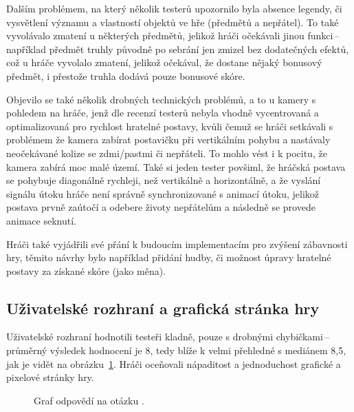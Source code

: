 Dalším problémem, na který několik testerů upozornilo byla absence legendy, či vysvětlení významu a vlastností objektů ve hře (předmětů a nepřátel). To také vyvolávalo zmatení u některých předmětů, jelikož hráči očekávali jinou funkci\,--\,například předmět truhly původně po sebrání jen zmizel bez dodatečných efektů, což u hráče vyvolalo zmatení, jelikož očekával, že dostane nějaký bonusový předmět, i přestože truhla dodává pouze bonusové skóre.

Objevilo se také několik drobných technických problémů, a to u kamery s pohledem na hráče, jenž dle recenzí testerů nebyla vhodně vycentrovaná a optimalizovaná pro rychlost hratelné postavy, kvůli čemuž se hráči setkávali s problémem že kamera  zabírat postavičku při vertikálním pohybu a nastávaly neočekávané kolize se zdmi/pastmi či nepřáteli. To mohlo vést i k pocitu, že kamera zabírá moc malé území. Také si jeden tester povšiml, že hráčská postava se pohybuje diagonálně rychleji, než vertikálně a horizontálně, a že vyslání signálu útoku hráče není správně synchronizované s animací útoku, jelikož postava prvně zaútočí a odebere životy nepřátelům a následně se provede animace seknutí.

Hráči také vyjádřili své přání k budoucím implementacím pro zvýšení zábavnosti hry, těmito návrhy bylo například přidání hudby, či možnost úpravy hratelné postavy za získané skóre (jako měna).

\subsection*{Uživatelské rozhraní a grafická stránka hry}
Uživatelské rozhraní hodnotili testeři kladně, pouze s drobnými chybičkami\,--\,průměrný výsledek hodnocení je 8, tedy blíže k velmi přehledné s mediánem 8,5, jak je vidět na obrázku~\ref{fig:hodnoceni_ui}. Hráči oceňovali nápaditost a jednoduchost grafické a pixelové stránky hry. 

\begin{figure}[hb]
\centering
\caption{Graf odpovědí na otázku .}
\label{fig:hodnoceni_ui}
\end{figure}

